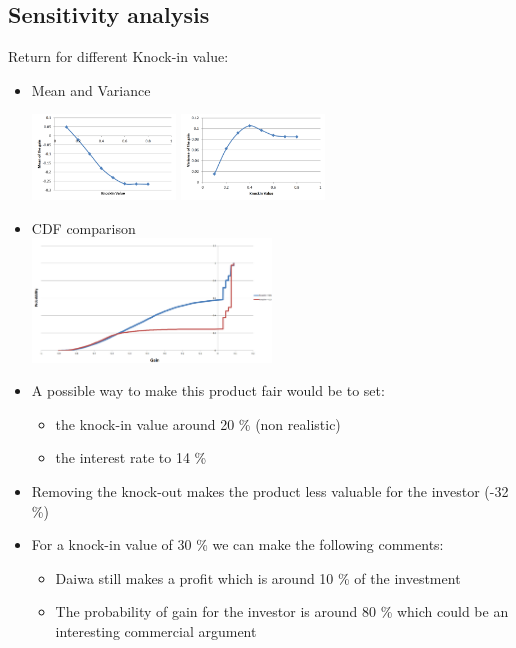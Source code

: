 \subsection{Sensitivity analysis}
\begin{frame}
\myframetitle{}
Return for different Knock-in value:
\begin{itemize}
	\item Mean and Variance \\
	\begin{center}
	\includegraphics[width=0.3\textwidth]{../Report/Mean_depending_on_knockin}
	\hspace{2cm}
	\includegraphics[width=0.3\textwidth]{../Report/Variance_depending_on_knockin}
	\end{center}
	\item CDF comparison \\
	\centering
	\includegraphics[width=0.5\textwidth]{../Report/KnockInCDFComparaison}
\end{itemize}
\end{frame}

\begin{frame}[c]
\myframetitle{}
\begin{itemize}
	\item A possible way to make this product fair would be to set:
	\begin{itemize}
			\item the knock-in value around 20 \% (non realistic)
			\item the interest rate to 14 \%
	\end{itemize}
	\item Removing the knock-out makes the product less valuable for the investor (-32 \%)
	\item For a knock-in value of 30 \% we can make the following comments: \\
	\begin{itemize}
		\item Daiwa still makes a profit which is around 10 \% of the investment
		\item The probability of gain for the investor is around 80 \% which could be an interesting commercial argument
	\end{itemize}
\end{itemize}
\end{frame}


